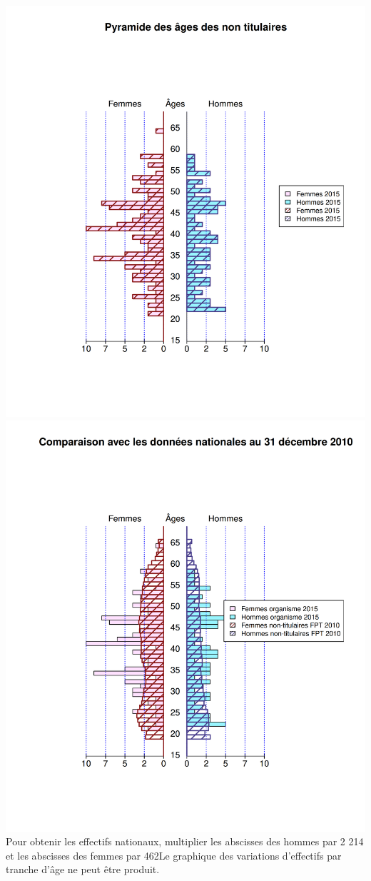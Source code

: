 \includegraphics{altair_files/figure-latex/unnamed-chunk-23-1.png}
\includegraphics{altair_files/figure-latex/unnamed-chunk-23-2.png} Pour
obtenir les effectifs nationaux, multiplier les abscisses des hommes par
2 214 et les abscisses des femmes par 462\newpage Le graphique des
variations d'effectifs par tranche d'âge ne peut être produit.

